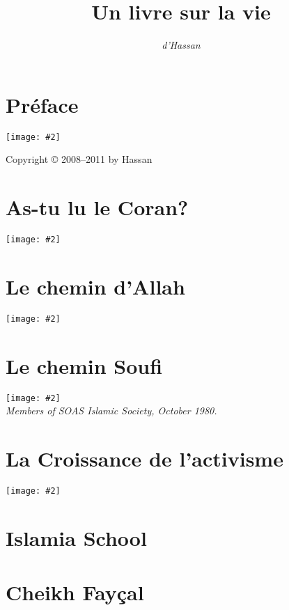 \documentclass[12pt]{memoir}
\title{Un livre sur la vie}
\author{\emph{d’Hassan}}
\newcommand{\img}[3]{\begin{center}%
\texttt{[image: \#2]}\\{\small\em#3}%
\end{center}}
\begin{document}
\frontmatter

\maketitle
\thispagestyle{empty}
\cleardoublepage

\setcounter{page}{1}
\tableofcontents

\chapter{Préface}

\img{scale=0.1}{Tunis_Hassan.jpg}{}


\hfill Copyright © 2008–2011 by Hassan

\mainmatter


\chapter{As-tu lu le Coran?}

\img{scale=0.7}{Baby_Hassan.jpg}{}


\chapter{Le chemin d’Allah}

\img{scale=1}{Hassan_1980.jpg}{}


\chapter{Le chemin Soufi}

\img{scale=0.7}{Members_SOAS_Islamic_Society.jpg}
{Members of SOAS Islamic Society, October 1980.}


\chapter{La Croissance de l’activisme}

\img{scale=0.7}{Assassination_of_Sadat.jpg}{}


\chapter{Islamia School}


\chapter{Cheikh Fayçal}
\end{document}
